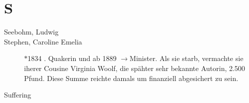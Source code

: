 \section*{S}

\articlesize

\begin{description}
 \item[Seebohm, Ludwig]

 \item[Stephen, Caroline Emelia] $\ast$1834 . Quakerin und ab 1889
 $\to$Minister. Als sie starb, vermachte sie iherer Cousine Virginia Woolf,
 die spähter sehr bekannte Autorin, 2.500 Pfund. Diese Summe reichte damals um
 finanziell abgesichert zu sein. 

 \item[Suffering]

 \end{description}

\normalsize
